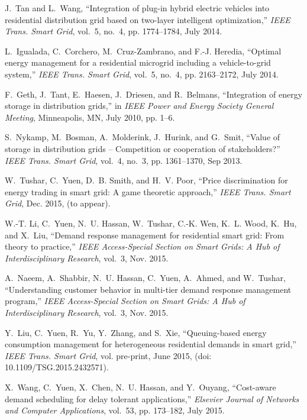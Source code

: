 \documentclass[journal,10pt]{IEEEtran}
\begin{document}
\begin{thebibliography}{10}
J.~Tan and L.~Wang, ``Integration of plug-in hybrid electric vehicles into
  residential distribution grid based on two-layer intelligent optimization,''
  \emph{IEEE Trans. Smart Grid}, vol.~5, no.~4, pp. 1774--1784, July 2014.

L.~Igualada, C.~Corchero, M.~Cruz-Zambrano, and F.-J. Heredia, ``Optimal energy
  management for a residential microgrid including a vehicle-to-grid system,''
  \emph{IEEE Trans. Smart Grid}, vol.~5, no.~4, pp. 2163--2172, July 2014.

F.~Geth, J.~Tant, E.~Haesen, J.~Driesen, and R.~Belmans, ``Integration of
  energy storage in distribution grids,'' in \emph{IEEE Power and Energy
  Society General Meeting}, Minneapolis, MN, July 2010, pp. 1--6.

S.~Nykamp, M.~Bosman, A.~Molderink, J.~Hurink, and G.~Smit, ``Value of storage
  in distribution grids -- {C}ompetition or cooperation of stakeholders?''
  \emph{IEEE Trans. Smart Grid}, vol.~4, no.~3, pp. 1361--1370, Sep 2013.

W.~Tushar, C.~Yuen, D.~B. Smith, and H.~V. Poor, ``Price discrimination for
  energy trading in smart grid: A game theoretic approach,'' \emph{IEEE Trans.
  Smart Grid}, Dec. 2015, (to appear).

W.-T. Li, C.~Yuen, N.~U. Hassan, W.~Tushar, C.-K. Wen, K.~L. Wood, K.~Hu, and
  X.~Liu, ``Demand response management for residential smart grid: From theory
  to practice,'' \emph{IEEE Access-Special Section on Smart Grids: A Hub of
  Interdisciplinary Research}, vol.~3, Nov. 2015.

A.~Naeem, A.~Shabbir, N.~U. Hassan, C.~Yuen, A.~Ahmed, and W.~Tushar,
  ``Understanding customer behavior in multi-tier demand response management
  program,'' \emph{IEEE Access-Special Section on Smart Grids: A Hub of
  Interdisciplinary Research}, vol.~3, Nov. 2015.

Y.~Liu, C.~Yuen, R.~Yu, Y.~Zhang, and S.~Xie, ``Queuing-based energy
  consumption management for heterogeneous residential demands in smart grid,''
  \emph{IEEE Trans. Smart Grid}, vol. pre-print, June 2015, (doi:
  10.1109/TSG.2015.2432571).

X.~Wang, C.~Yuen, X.~Chen, N.~U. Hassan, and Y.~Ouyang, ``Cost-aware demand
  scheduling for delay tolerant applications,'' \emph{Elsevier Journal of
  Networks and Computer Applications}, vol.~53, pp. 173--182, July 2015.


\end{thebibliography}
\end{document}
